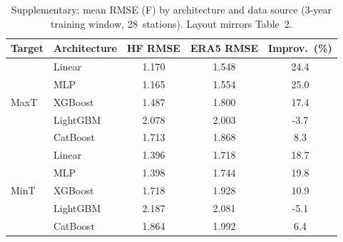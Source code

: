 \begin{table}[ht]
\centering
\caption{Supplementary: mean RMSE (\textdegree{}F) by architecture and data source
(3-year training window, 28~stations). Layout mirrors Table~2.}
\label{tab:supp_rmse}
\small
\begin{tabular}{llccc}
\toprule
Target & Architecture & HF RMSE & ERA5 RMSE & Improv.\ (\%) \\
\midrule
  \multirow{5}{*}{MaxT} & Linear & 1.170 & 1.548 & 24.4 \\
   & MLP & 1.165 & 1.554 & 25.0 \\
   & XGBoost & 1.487 & 1.800 & 17.4 \\
   & LightGBM & 2.078 & 2.003 & -3.7 \\
   & CatBoost & 1.713 & 1.868 & 8.3 \\
\midrule
  \multirow{5}{*}{MinT} & Linear & 1.396 & 1.718 & 18.7 \\
   & MLP & 1.398 & 1.744 & 19.8 \\
   & XGBoost & 1.718 & 1.928 & 10.9 \\
   & LightGBM & 2.187 & 2.081 & -5.1 \\
   & CatBoost & 1.864 & 1.992 & 6.4 \\
\bottomrule
\end{tabular}
\end{table}
